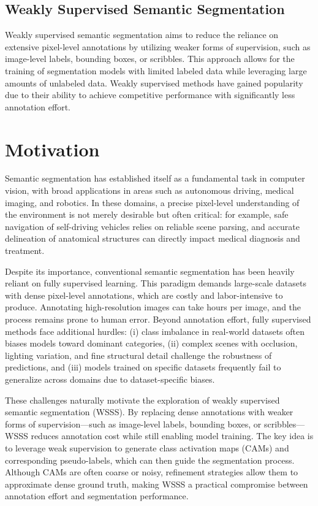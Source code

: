 \subsection{Weakly Supervised Semantic Segmentation}
\label{subsec:weakly_supervised}
Weakly supervised semantic segmentation aims to reduce the reliance on extensive pixel-level annotations by utilizing weaker forms of supervision, such as image-level labels, bounding boxes, or scribbles. This approach allows for the training of segmentation models with limited labeled data while leveraging large amounts of unlabeled data. Weakly supervised methods have gained popularity due to their ability to achieve competitive performance with significantly less annotation effort.

\section{Motivation}
\label{sec:motivation}

Semantic segmentation has established itself as a fundamental task in computer vision, with broad applications in areas such as autonomous driving, medical imaging, and robotics. In these domains, a precise pixel-level understanding of the environment is not merely desirable but often critical: for example, safe navigation of self-driving vehicles relies on reliable scene parsing, and accurate delineation of anatomical structures can directly impact medical diagnosis and treatment.

Despite its importance, conventional semantic segmentation has been heavily reliant on fully supervised learning. This paradigm demands large-scale datasets with dense pixel-level annotations, which are costly and labor-intensive to produce. Annotating high-resolution images can take hours per image, and the process remains prone to human error. Beyond annotation effort, fully supervised methods face additional hurdles: (i) class imbalance in real-world datasets often biases models toward dominant categories, (ii) complex scenes with occlusion, lighting variation, and fine structural detail challenge the robustness of predictions, and (iii) models trained on specific datasets frequently fail to generalize across domains due to dataset-specific biases.

These challenges naturally motivate the exploration of weakly supervised semantic segmentation (WSSS). By replacing dense annotations with weaker forms of supervision—such as image-level labels, bounding boxes, or scribbles—WSSS reduces annotation cost while still enabling model training. The key idea is to leverage weak supervision to generate class activation maps (CAMs) and corresponding pseudo-labels, which can then guide the segmentation process. Although CAMs are often coarse or noisy, refinement strategies allow them to approximate dense ground truth, making WSSS a practical compromise between annotation effort and segmentation performance.

